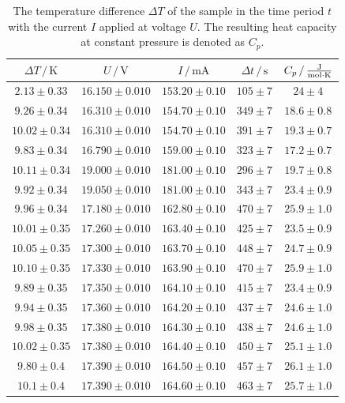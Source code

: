 \begin{table}
    \centering
    \caption{The temperature difference $\Delta T$ of the sample in the time period $t$ with the current $I$ applied at voltage $U$. The resulting heat capacity at constant pressure is denoted as $C_p$.}
    \label{tab:C_p}
    \begin{tabular}{c c c c c}
        \toprule
        $\Delta T \,/\, \unit{\kelvin}$ & $U \,/\, \unit{\volt}$ & $I \,/\, \unit{\milli\ampere}$ & $\Delta t \,/\, \unit{\second}$ & $C_p \,/\, \unit{\frac{\joule}{\mol \cdot \kelvin}}$ \\
        \midrule
        $2.13\pm0.33$ & $16.150\pm0.010$ & $153.20\pm0.10$ & $105\pm7$ & $24\pm4$ \\
        $9.26\pm0.34$ & $16.310\pm0.010$ & $154.70\pm0.10$ & $349\pm7$ & $18.6\pm0.8$ \\
        $10.02\pm0.34$ & $16.310\pm0.010$ & $154.70\pm0.10$ & $391\pm7$ & $19.3\pm0.7$ \\
        $9.83\pm0.34$ & $16.790\pm0.010$ & $159.00\pm0.10$ & $323\pm7$ & $17.2\pm0.7$ \\
        $10.11\pm0.34$ & $19.000\pm0.010$ & $181.00\pm0.10$ & $296\pm7$ & $19.7\pm0.8$ \\
        $9.92\pm0.34$ & $19.050\pm0.010$ & $181.00\pm0.10$ & $343\pm7$ & $23.4\pm0.9$ \\
        $9.96\pm0.34$ & $17.180\pm0.010$ & $162.80\pm0.10$ & $470\pm7$ & $25.9\pm1.0$ \\
        $10.01\pm0.35$ & $17.260\pm0.010$ & $163.40\pm0.10$ & $425\pm7$ & $23.5\pm0.9$ \\
        $10.05\pm0.35$ & $17.300\pm0.010$ & $163.70\pm0.10$ & $448\pm7$ & $24.7\pm0.9$ \\
        $10.10\pm0.35$ & $17.330\pm0.010$ & $163.90\pm0.10$ & $470\pm7$ & $25.9\pm1.0$ \\
        $9.89\pm0.35$ & $17.350\pm0.010$ & $164.10\pm0.10$ & $415\pm7$ & $23.4\pm0.9$ \\
        $9.94\pm0.35$ & $17.360\pm0.010$ & $164.20\pm0.10$ & $437\pm7$ & $24.6\pm1.0$ \\
        $9.98\pm0.35$ & $17.380\pm0.010$ & $164.30\pm0.10$ & $438\pm7$ & $24.6\pm1.0$ \\
        $10.02\pm0.35$ & $17.380\pm0.010$ & $164.40\pm0.10$ & $450\pm7$ & $25.1\pm1.0$ \\
        $9.80\pm0.4$ & $17.390\pm0.010$ & $164.50\pm0.10$ & $457\pm7$ & $26.1\pm1.0$ \\
        $10.1\pm0.4$ & $17.390\pm0.010$ & $164.60\pm0.10$ & $463\pm7$ & $25.7\pm1.0$ \\

\end{tabular}
\end{table}
